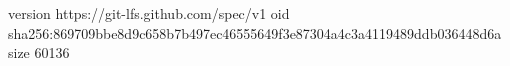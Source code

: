 version https://git-lfs.github.com/spec/v1
oid sha256:869709bbe8d9c658b7b497ec46555649f3e87304a4c3a4119489ddb036448d6a
size 60136
